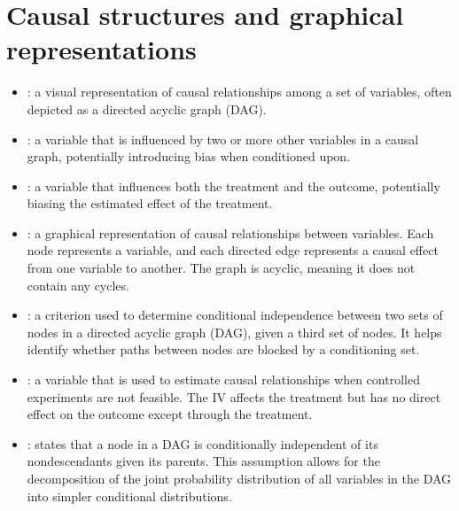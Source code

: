 \documentclass[letterpaper,10pt,english]{jupyterBook}
\begin{document}
\section{Causal structures and graphical representations}
\label{\detokenize{notebooks/glossary:causal-structures-and-graphical-representations}}\begin{itemize}
\item {} 
\sphinxAtStartPar
{}: a visual representation of causal relationships among a set of variables, often depicted as a directed acyclic graph (DAG).

\item {} 
\sphinxAtStartPar
{}: a variable that is influenced by two or more other variables in a causal graph, potentially introducing bias when conditioned upon.

\item {} 
\sphinxAtStartPar
{}: a variable that influences both the treatment and the outcome, potentially biasing the estimated effect of the treatment.

\item {} 
\sphinxAtStartPar
{}: a graphical representation of causal relationships between variables. Each node represents a variable, and each directed edge represents a causal effect from one variable to another. The graph is acyclic, meaning it does not contain any cycles.

\item {} 
\sphinxAtStartPar
{}: a criterion used to determine conditional independence between two sets of nodes in a directed acyclic graph (DAG), given a third set of nodes. It helps identify whether paths between nodes are blocked by a conditioning set.

\item {} 
\sphinxAtStartPar
{}: a variable that is used to estimate causal relationships when controlled experiments are not feasible. The IV affects the treatment but has no direct effect on the outcome except through the treatment.

\item {} 
\sphinxAtStartPar
{}: states that a node in a DAG is conditionally independent of its non\sphinxhyphen{}descendants given its parents. This assumption allows for the decomposition of the joint probability distribution of all variables in the DAG into simpler conditional distributions.


\end{itemize}
\end{document}
